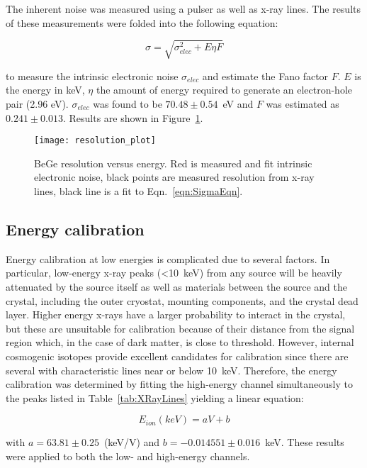 The inherent noise was measured using a pulser as well as x-ray lines.  The results of these measurements were folded into the following equation:

			\begin{equation}
				\sigma = \sqrt{\sigma_{elec}^{2} + E \eta F}
				\label{eqn:SigmaEqn}
			\end{equation}

to measure the intrinsic electronic noise $\sigma_{elec}$ and estimate the Fano factor $F$.  $E$ is the energy in keV, $\eta$ the amount of energy required to generate an electron-hole pair (2.96 eV).  $\sigma_{elec}$ was found to be $70.48\pm0.54$~eV and $F$ was estimated as $0.241\pm0.013$.  Results are shown in Figure~\ref{fig:BeGeResPlot}.

			\begin{figure}
				\centering
				\texttt{[image: resolution\_plot]}
				\caption[BeGe resolution versus energy]
				{BeGe resolution versus energy.  Red is measured and fit intrinsic electronic noise, 
				black points are measured resolution from x-ray lines, black line is a fit to 
				Eqn.~\ref{eqn:SigmaEqn}.}
				\label{fig:BeGeResPlot}
			\end{figure}

		\subsection{Energy calibration}

Energy calibration at low energies is complicated due to several factors.  In particular, low-energy x-ray peaks (<10~keV) from any source will be heavily attenuated by the source itself as well as materials between the source and the crystal, including the outer cryostat, mounting components, and the crystal dead layer.  Higher energy x-rays have a larger probability to interact in the crystal, but these are unsuitable for calibration because of their distance from the signal region which, in the case of dark matter, is close to threshold.  However, internal cosmogenic isotopes provide excellent candidates for calibration since there are several with characteristic lines near or below 10~keV.  Therefore, the energy calibration was determined by fitting the high-energy channel simultaneously to the peaks listed in Table~\ref{tab:XRayLines} yielding a linear equation:

			\[
			E_{ion} (keV) = a V + b
			\]  

with $a = 63.81\pm0.25$~(keV/V) and $b = -0.014551\pm0.016$~keV.  These results were applied to both the low- and high-energy channels.  

